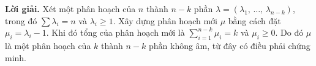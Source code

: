 \textbf{Lời giải. }Xét một phân hoạch của $n$ thành $n-k$ phần $\lambda = (\lambda_1,\,\ldots,\,\lambda_{n-k})$, trong đó $\displaystyle\sum\lambda_i = n$ và $\lambda_i \ge 1$. Xây dựng phân hoạch mới $\mu$ bằng cách đặt $\mu_i = \lambda_i - 1$. Khi đó tổng của phân hoạch mới là $\displaystyle\sum\limits_{i=1}^{n-k}\mu_i = k$ và $\mu_i \ge 0$. Do đó $\mu$ là một phân hoạch của $k$ thành $n-k$ phần không âm, từ đây có điều phải chứng minh. 








